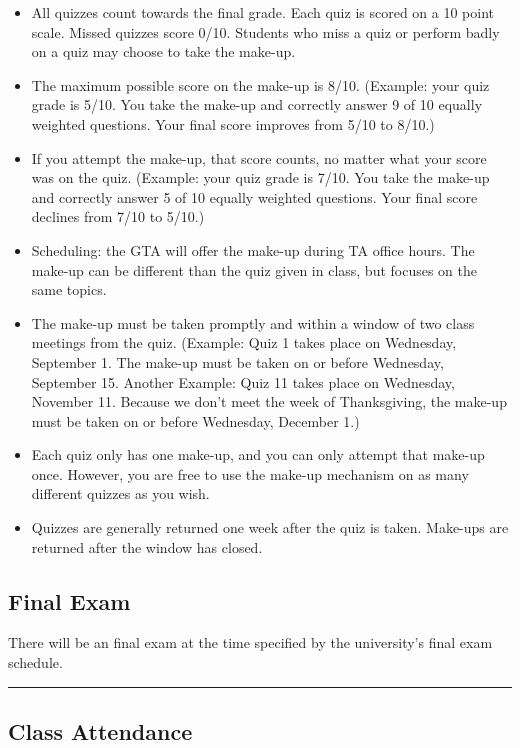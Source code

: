 \documentclass[11pt]{article}
\begin{document}
\begin{itemize}
\item
  All quizzes count towards the final grade. Each quiz is scored on a 10
  point scale. Missed quizzes score 0/10. Students who miss a quiz or
  perform badly on a quiz may choose to take the make-up.
\item
  The maximum possible score on the make-up is 8/10. (Example: your quiz
  grade is 5/10. You take the make-up and correctly answer 9 of 10
  equally weighted questions. Your final score improves from 5/10 to
  8/10.)
\item
  If you attempt the make-up, that score counts, no matter what your
  score was on the quiz. (Example: your quiz grade is 7/10. You take the
  make-up and correctly answer 5 of 10 equally weighted questions. Your
  final score declines from 7/10 to 5/10.)
\item
  Scheduling: the GTA will offer the make-up during TA office hours. The
  make-up can be different than the quiz given in class, but focuses on
  the same topics.
\item
  The make-up must be taken promptly and within a window of two class
  meetings from the quiz. (Example: Quiz 1 takes place on Wednesday,
  September 1. The make-up must be taken on or before Wednesday,
  September 15. Another Example: Quiz 11 takes place on Wednesday,
  November 11. Because we don't meet the week of
  Thanksgiving, the make-up must be taken on or before Wednesday,
  December 1.)
\item
  Each quiz only has one make-up, and you can only attempt that make-up
  once. However, you are free to use the make-up mechanism on as many
  different quizzes as you wish.
\item
  Quizzes are generally returned one week after the quiz is taken.
  Make-ups are returned after the window has closed.
\end{itemize}

\subsection{Final Exam}\label{final-exam}

There will be an final exam at the time specified by the
university's final exam schedule.

\begin{center}\rule{0.5\linewidth}{0.5pt}\end{center}

\subsection{Class Attendance}\label{class-attendance}
\end{document}
